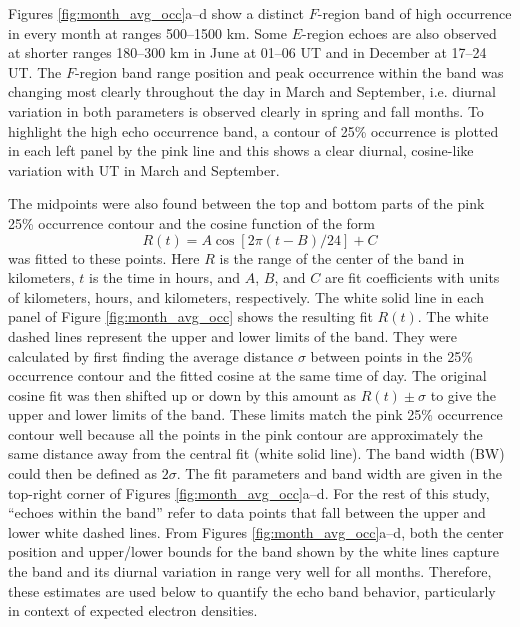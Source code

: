 Figures \ref{fig:month_avg_occ}a--d show a distinct \(F\)-region band of high occurrence in every month at ranges 500--1500 km. Some \(E\)-region echoes are also observed at shorter ranges 180--300 km in June at 01--06 UT and in December at 17--24 UT. The \(F\)-region band range position and peak occurrence within the band was changing most clearly throughout the day in March and September, i.e. diurnal variation in both parameters is observed clearly in spring and fall months. To highlight the high echo occurrence band, a contour of 25\% occurrence is plotted in each left panel by the pink line and this shows a clear diurnal, cosine-like variation with UT in March and September.

The midpoints were also found between the top and bottom parts of the pink 25\% occurrence contour and the cosine function of the form
\begin{equation}\label{E:Model}
R\left(t\right) = A \cos\left[2\pi\left(t-B\right)/24\right] + C
\end{equation}
was fitted to these points. Here \(R\) is the range of the center of the band in kilometers, \(t\) is the time in hours, and  \(A\), \(B\), and \(C\) are fit coefficients with units of kilometers, hours, and kilometers, respectively. The white solid line in each panel of Figure \ref{fig:month_avg_occ} shows the resulting fit \(R\left(t\right)\). The white dashed lines represent the upper and lower limits of the band.  They were calculated by first finding the average distance \(\sigma\) between points in the 25\% occurrence contour and the fitted cosine at the same time of day. The original cosine fit was then shifted up or down by this amount as \(R\left(t\right) \pm \sigma\) to give the upper and lower limits of the band.  These limits match the pink 25\% occurrence contour well because all the points in the pink contour are approximately the same distance away from the central fit (white solid line). The band width (BW) could then be defined as \(2\sigma\). The fit parameters and band width are given in the top-right corner of Figures \ref{fig:month_avg_occ}a--d. For the rest of this study, ``echoes within the band'' refer to data points that fall between the upper and lower white dashed lines. From Figures \ref{fig:month_avg_occ}a--d, both the center position and upper/lower bounds for the band shown by the white lines capture the band and its diurnal variation in range very well for all months. Therefore, these estimates are used below to quantify the echo band behavior, particularly in context of expected electron densities.

